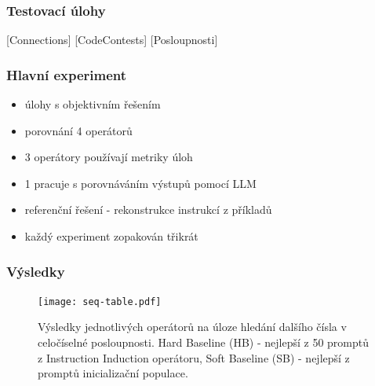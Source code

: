 \documentclass[aspectratio=169]{beamer}
\begin{document}
\begin{frame}
	\frametitle{Testovací úlohy}
	[Connections]
	[CodeContests]
	[Posloupnosti]
\end{frame}

\begin{frame}
	\frametitle{Hlavní experiment}
	\begin{itemize}
		\item úlohy s objektivním řešením
		\item porovnání 4 operátorů
		\item 3 operátory používají metriky úloh
		\item 1 pracuje s porovnáváním výstupů pomocí LLM
		\item referenční řešení - rekonstrukce instrukcí z příkladů
		\item každý experiment zopakován třikrát
	\end{itemize}
\end{frame}

\begin{frame}
	\frametitle{Výsledky}
	\begin{figure}
		\texttt{[image: seq-table.pdf]}
		\caption{Výsledky jednotlivých operátorů na úloze hledání dalšího čísla v celočíselné posloupnosti. Hard Baseline (HB) - nejlepší z 50 promptů z Instruction Induction operátoru, Soft Baseline (SB) - nejlepší z promptů inicializační populace.}
	\end{figure}
\end{frame}
\end{document}
